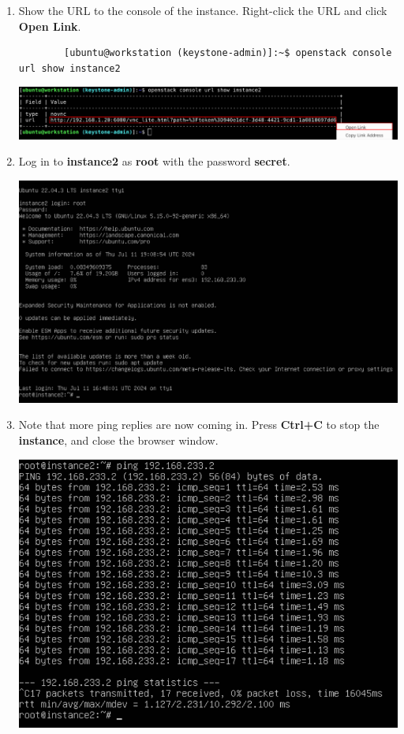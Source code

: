 \documentclass[letterpaper, 12pt]{article}
\begin{document}
\begin{enumerate}
    \item Show the URL to the console of the instance.
    Right-click the URL and click \textbf{Open Link}.
    \begin{lstlisting}
        [ubuntu@workstation (keystone-admin)]:~$ openstack console url show instance2
    \end{lstlisting}

    \begin{center}
        \includegraphics[width=\linewidth]{images/part4/step13.png}
    \end{center}

    \item Log in to \textbf{instance2} as \textbf{root} with the password \textbf{secret}.

    \begin{center}
        \includegraphics[width=\linewidth]{images/part4/step14.png}
    \end{center}

    \item Note that more ping replies are now coming in.
    Press \textbf{Ctrl+C} to stop the \textbf{instance}, and close the browser window.

    \begin{center}
        \includegraphics[width=\linewidth]{images/part4/step15.png}
    \end{center}


\end{enumerate}
\end{document}
